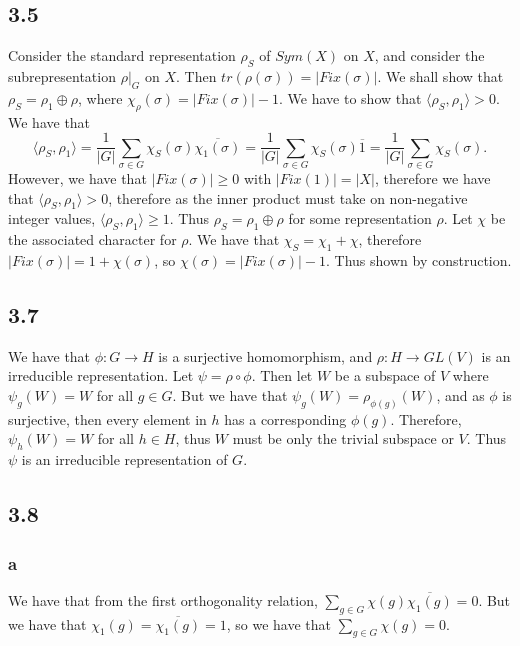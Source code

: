 \documentclass[]{article}
\begin{document}
\subsection*{3.5}
Consider the standard representation $\rho_S$ of $Sym(X)$ on $X$, and consider the subrepresentation $\rho |_G$ on $X$. Then $tr(\rho(\sigma)) = |Fix(\sigma)|$. 
We shall show that $\rho_S = \rho_1 \oplus \rho$, where $\chi_\rho(\sigma) = |Fix(\sigma)| - 1$. We have to show that $\langle \rho_S, \rho_1 \rangle > 0$. We have that 
\begin{equation}
	\langle \rho_S, \rho_1 \rangle = \frac{1}{|G|} \sum_{\sigma \in G} \chi_S(\sigma) \overline{\chi_1(\sigma)} = \frac{1}{|G|} \sum_{\sigma \in G} \chi_S(\sigma) \overline{1} = \frac{1}{|G|} \sum_{\sigma \in G} \chi_S(\sigma).
\end{equation}
However, we have that $|Fix(\sigma)| \geq 0$ with $|Fix(1)| = |X|$, therefore we have that $ \langle \rho_S, \rho_1 \rangle > 0$, therefore as the inner product must take on non-negative integer values, $\langle \rho_S, \rho_1 \rangle \geq 1$. Thus $\rho_S = \rho_1 \oplus \rho$ for some representation $\rho$. 
Let $\chi$ be the associated character for $\rho$. 
 We have that $\chi_S = \chi_1 + \chi$, therefore $|Fix(\sigma)| = 1 + \chi(\sigma)$, so $\chi(\sigma) = |Fix(\sigma)| - 1$. Thus shown by construction.

\subsection*{3.7}
We have that $\phi: G \rightarrow H$ is a surjective homomorphism, and $\rho: H \rightarrow GL(V)$ is an irreducible representation. Let $\psi =  \rho \circ \phi$. Then let $W$ be a subspace of $V$ where $\psi_g(W) = W$ for all $g \in G$. But we have that $\psi_g(W) = \rho_{\phi(g)}(W)$, and as $\phi$ is surjective, then every element in $h$ has a corresponding $\phi(g)$. Therefore, $\psi_h(W) = W$ for all $h \in H$, thus $W$ must be only the trivial subspace or $V$. Thus $\psi$ is an irreducible representation of $G$.
\subsection*{3.8}
\subsubsection*{a}
We have that from the first orthogonality relation,
$\sum_{g \in G} \chi(g) \overline{\chi_1(g)} = 0$. But we have that $\chi_1(g) = \overline{\chi_1(g)} = 1$, so we have that $\sum_{g \in G} \chi(g) = 0$. 
\end{document}
